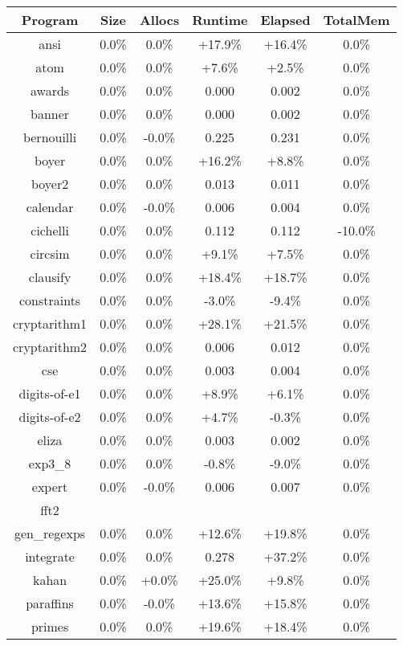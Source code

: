\begin{tabular}{ c c c c c c }
Program & Size & Allocs & Runtime & Elapsed & TotalMem\\
\hline
ansi &  0.0\% &  0.0\% & +17.9\% & +16.4\% &  0.0\%\\
atom &  0.0\% &  0.0\% & +7.6\% & +2.5\% &  0.0\%\\
awards &  0.0\% &  0.0\% & 0.000 & 0.002 &  0.0\%\\
banner &  0.0\% &  0.0\% & 0.000 & 0.002 &  0.0\%\\
bernouilli &  0.0\% & -0.0\% & 0.225 & 0.231 &  0.0\%\\
boyer &  0.0\% &  0.0\% & +16.2\% & +8.8\% &  0.0\%\\
boyer2 &  0.0\% &  0.0\% & 0.013 & 0.011 &  0.0\%\\
calendar &  0.0\% & -0.0\% & 0.006 & 0.004 &  0.0\%\\
cichelli &  0.0\% &  0.0\% & 0.112 & 0.112 & -10.0\%\\
circsim &  0.0\% &  0.0\% & +9.1\% & +7.5\% &  0.0\%\\
clausify &  0.0\% &  0.0\% & +18.4\% & +18.7\% &  0.0\%\\
constraints &  0.0\% &  0.0\% & -3.0\% & -9.4\% &  0.0\%\\
cryptarithm1 &  0.0\% &  0.0\% & +28.1\% & +21.5\% &  0.0\%\\
cryptarithm2 &  0.0\% &  0.0\% & 0.006 & 0.012 &  0.0\%\\
cse &  0.0\% &  0.0\% & 0.003 & 0.004 &  0.0\%\\
digits-of-e1 &  0.0\% &  0.0\% & +8.9\% & +6.1\% &  0.0\%\\
digits-of-e2 &  0.0\% &  0.0\% & +4.7\% & -0.3\% &  0.0\%\\
eliza &  0.0\% &  0.0\% & 0.003 & 0.002 &  0.0\%\\
exp3\_8 &  0.0\% &  0.0\% & -0.8\% & -9.0\% &  0.0\%\\
expert &  0.0\% & -0.0\% & 0.006 & 0.007 &  0.0\%\\
fft2 &  &  &  &  & \\
gen\_regexps &  0.0\% &  0.0\% & +12.6\% & +19.8\% &  0.0\%\\
integrate &  0.0\% &  0.0\% & 0.278 & +37.2\% &  0.0\%\\
kahan &  0.0\% & +0.0\% & +25.0\% & +9.8\% &  0.0\%\\
paraffins &  0.0\% & -0.0\% & +13.6\% & +15.8\% &  0.0\%\\
primes &  0.0\% &  0.0\% & +19.6\% & +18.4\% &  0.0\%\\

\end{tabular}
